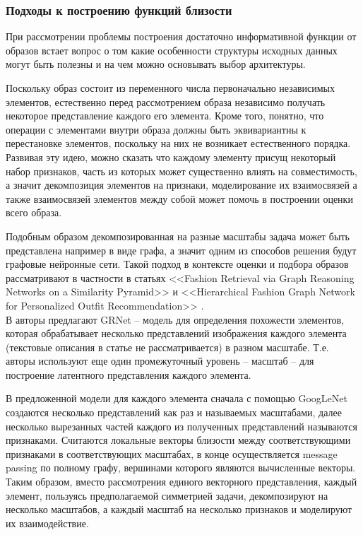 \documentclass[a4paper,14pt]{extarticle}
\begin{document}
		
		
			\subsubsection{Подходы к построению функций близости}
				При рассмотрении проблемы построения достаточно информативной функции от образов встает вопрос о том какие особенности структуры исходных данных могут быть полезны и на чем можно основывать выбор архитектуры. 
				
				Поскольку образ состоит из переменного числа первоначально независимых элементов, естественно перед рассмотрением образа независимо получать некоторое представление каждого его элемента. Кроме того, понятно, что операции с элементами внутри образа должны быть эквивариантны к перестановке элементов, поскольку на них не возникает естественного порядка. Развивая эту идею, можно сказать что каждому элементу присущ некоторый набор признаков, часть из которых может существенно влиять на совместимость, а значит декомпозиция элементов на признаки, моделирование их взаимосвязей а также взаимосвязей элементов между собой может помочь в построении оценки всего образа. 
				
				Подобным образом декомпозированная на разные масштабы задача может быть представлена например в виде графа, а значит одним из способов решения будут графовые нейронные сети. Такой подход в контексте оценки и подбора образов рассматривают в частности в статьях <<Fashion Retrieval via Graph Reasoning Networks on a Similarity
				Pyramid>> \cite{https://doi.org/10.48550/arXiv.1908.11754} и <<Hierarchical Fashion Graph Network for Personalized Outfit
				Recommendation>> \cite{https://doi.org/10.48550/arXiv.2005.12566}. \\
				
				В \cite{https://doi.org/10.48550/arXiv.1908.11754} авторы предлагают GRNet – модель для определения похожести элементов, которая обрабатывает несколько представлений изображения каждого элемента (текстовые описания в статье не рассматривается) в разном масштабе. Т.е. авторы используют еще один промежуточный уровень -- масштаб -- для построение латентного представления каждого элемента. 
				
				В предложенной модели для каждого элемента сначала с помощью GoogLeNet \cite{https://doi.org/10.48550/arXiv.1409.4842} создаются несколько представлений как раз и называемых масштабами, далее несколько вырезанных частей каждого из полученных представлений называются признаками. Считаются локальные векторы близости между соответствующими признаками в соответствующих масштабах, в конце осуществляется message passing \cite{gilmer2017neural} по полному графу, вершинами которого являются вычисленные векторы. Таким образом, вместо рассмотрения единого векторного представления, каждый элемент, пользуясь предполагаемой симметрией задачи, декомпозируют на несколько масштабов, а каждый масштаб на несколько признаков и моделируют их взаимодействие.
				
\end{document}
